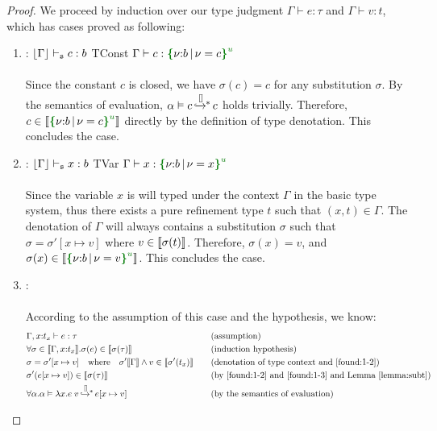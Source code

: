 \begin{proof} We proceed by induction over our type judgment $\Gamma \vdash e : \tau$ and $\Gamma \vdash v : t$, which has cases proved as following:
\begin{enumerate}[label=Case]
\item:
{\footnotesize
\mprooftr{25mm}
{$\lfloor {\Gamma} \rfloor \vdash_{{\tt s}} c : b$}
{TConst}
{$\Gamma \vdash c : \urt{b}{\vnu = c}$}
\ \\ \ \\}
Since the constant $c$ is closed, we have $\sigma(c) = c$ for any substitution $\sigma$. By the semantics of evaluation, ${\alpha}\vDash{c}{\,\xhookrightarrow{[]}\,\hspace{-5pt}^*\,}{c}$ holds trivially. Therefore, $c \in \denot{\urt{b}{\vnu = c}}$ directly by the definition of type denotation. This concludes the case.
\item:
{\footnotesize
\mprooftr{25mm}
{$\lfloor {\Gamma} \rfloor \vdash_{{\tt s}} x : b$}
{TVar}
{$\Gamma \vdash x : \urt{b}{\vnu = x}$}
\ \\ \ \\}
Since the variable $x$ is will typed under the context $\Gamma$ in the basic type system, thus there exists a pure refinement type $t$ such that $(x, t) \in \Gamma$. The denotation of $\Gamma$ will always contains a substitution $\sigma$ such that $\sigma = \sigma'[x\mapsto v]$ where $v \in \llbracket {\sigma(t)} \rrbracket$. Therefore, $\sigma(x) = v$, and $\sigma(x) \in \denot{\urt{b}{\vnu = v}}$. This concludes the case.
\item:
{\footnotesize
{}
\ \\ \ \\}
According to the assumption of this case and the hypothesis, we know:
{\footnotesize\begin{alignat}{2}
  \setcounter{equation}{0}
  &\Gamma, x{:}t_x\vdash e : \tau \ptag{assumption} \label{found:1-1} \\
  &\forall \sigma \in \denot{\Gamma, x{:}t_x}. \sigma(e) \in \denot{\sigma(\tau)} \ptag{induction hypothesis} \label{found:1-2} \\
  &\sigma =\sigma'[x\mapsto v] \quad \text{where} \quad \sigma' \denot{\Gamma} \land v \in \denot{\sigma'(t_x)} \ptag{denotation of type context and \ref{found:1-2}} \label{found:1-3} \\
  &\sigma'(e[x\mapsto v]) \in \denot{\sigma(\tau)} \ptag{by \ref{found:1-2} and \ref{found:1-3} and Lemma~\ref{lemma:subt}} \label{found:1-4} \\
  &\forall \alpha. \msteptr{\alpha}{\zzlam{x}{e}\;v}{[]}{e[x\mapsto v]} \ptag{by the semantics of evaluation} \label{found:1-5} \\

\end{alignat}}
\end{enumerate}
\end{proof}
